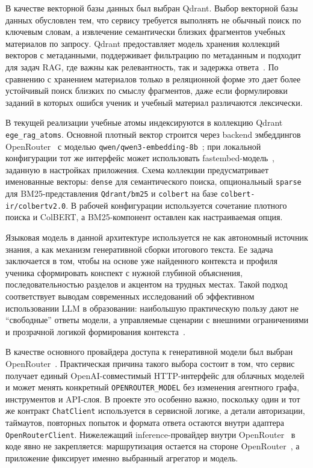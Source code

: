 \documentclass[a4paper,12pt]{extarticle}
\begin{document}
В качестве векторной базы данных был выбран Qdrant. Выбор векторной базы данных обусловлен тем, 
что сервису требуется выполнять не обычный поиск по ключевым словам, 
а извлечение семантически близких фрагментов учебных материалов по запросу. 
Qdrant предоставляет модель хранения коллекций векторов с метаданными, 
поддерживает фильтрацию по метаданным и подходит для задач RAG, 
где важны как релевантность, так и задержка ответа~\cite{qdrant2026}. 
По сравнению с хранением материалов только в реляционной форме это дает более устойчивый 
поиск близких по смыслу фрагментов, даже если формулировки заданий в которых ошибся ученик и 
учебный материал различаются лексически.

В текущей реализации учебные атомы индексируются в коллекцию Qdrant
\texttt{ege\_rag\_atoms}. Основной плотный вектор строится через backend
эмбеддингов OpenRouter~\cite{openrouter2026} с моделью 
\texttt{qwen/qwen3-embedding-8b}~\cite{qwen3embedding8b}; при локальной
конфигурации тот же интерфейс может использовать fastembed-модель~\cite{fastembed2026}, заданную в
настройках приложения. Схема коллекции предусматривает именованные векторы:
\texttt{dense} для семантического поиска, опциональный \texttt{sparse} для
BM25-представления \texttt{Qdrant/bm25} и \texttt{colbert} на базе \texttt{colbert-ir/colbertv2.0}. 
В рабочей конфигурации
используется сочетание плотного поиска и ColBERT, а BM25-компонент оставлен как
настраиваемая опция.

Языковая модель в данной архитектуре используется не как автономный источник знания, 
а как механизм генеративной сборки итогового текста. Ее задача заключается в том, 
чтобы на основе уже найденного контекста и профиля ученика сформировать конспект 
с нужной глубиной объяснения, последовательностью разделов и акцентом на трудных местах. 
Такой подход соответствует выводам современных исследований об эффективном использовании 
LLM в образовании: наибольшую практическую пользу дают не ``свободные'' ответы модели, 
а управляемые сценарии с внешними ограничениями и прозрачной логикой формирования 
контекста~\cite{kasneci2023chatgpt,yan2024challenges,shi2025llmedu}.

В качестве основного провайдера доступа к генеративной модели был выбран
OpenRouter~\cite{openrouter2026}. Практическая причина такого выбора состоит в том, что сервис получает
единый OpenAI-совместимый HTTP-интерфейс для облачных моделей и может менять
конкретный \texttt{OPENROUTER\_MODEL} без изменения агентного графа,
инструментов и API-слоя. В проекте это особенно важно, поскольку один и тот же
контракт \texttt{ChatClient} используется в сервисной логике, а детали
авторизации, таймаутов, повторных попыток и формата ответа остаются внутри
адаптера \texttt{OpenRouterClient}. Нижележащий inference-провайдер внутри
OpenRouter~\cite{openrouter2026} в коде явно не закрепляется: маршрутизация остается на стороне
OpenRouter~\cite{openrouter2026}, а приложение фиксирует именно выбранный агрегатор и модель.
\end{document}
